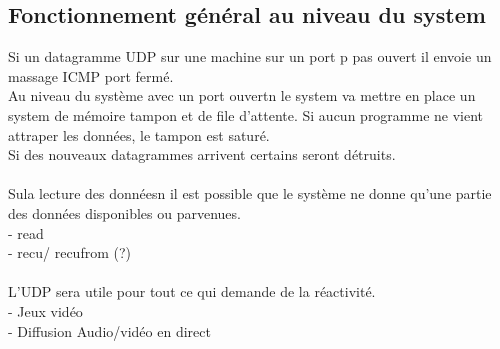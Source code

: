 \documentclass{article}
\begin{document}
\subsection{Fonctionnement général au niveau du system}
Si un datagramme UDP sur une machine sur un port p pas ouvert il envoie un massage ICMP port fermé. \\
Au niveau du système avec un port ouvertn le system va mettre en place un system de mémoire tampon et de file d'attente. Si aucun programme ne vient attraper les données, le tampon est saturé. \\
Si des nouveaux datagrammes arrivent certains seront détruits. \\
\\
Sula lecture des donnéesn il est possible que le système ne donne qu'une partie des données disponibles ou parvenues. \\
- read \\
- recu/ recufrom (?) \\
\\
L'UDP sera utile pour tout ce qui demande de la réactivité. \\
- Jeux vidéo \\
- Diffusion Audio/vidéo en direct \\
\end{document}
